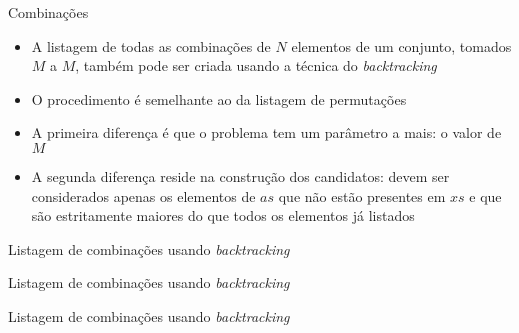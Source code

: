 \begin{frame}[fragile]{Combinações}

    \begin{itemize}
        \item A listagem de todas as combinações de $N$ elementos de um conjunto, tomados
            $M$ a $M$, também pode ser criada usando a técnica do \textit{backtracking}

        \item O procedimento é semelhante ao da listagem de permutações

        \item A primeira diferença é que o problema tem um parâmetro a mais: o valor de $M$

        \item A segunda diferença reside na construção dos candidatos: devem ser considerados
            apenas os elementos de $as$ que não estão presentes em $xs$ e que são estritamente
            maiores do que todos os elementos já listados
    \end{itemize}

\end{frame}

\begin{frame}[fragile]{Listagem de combinações usando {\it backtracking}}
\end{frame}

\begin{frame}[fragile]{Listagem de combinações usando {\it backtracking}}
\end{frame}

\begin{frame}[fragile]{Listagem de combinações usando {\it backtracking}}
\end{frame}
